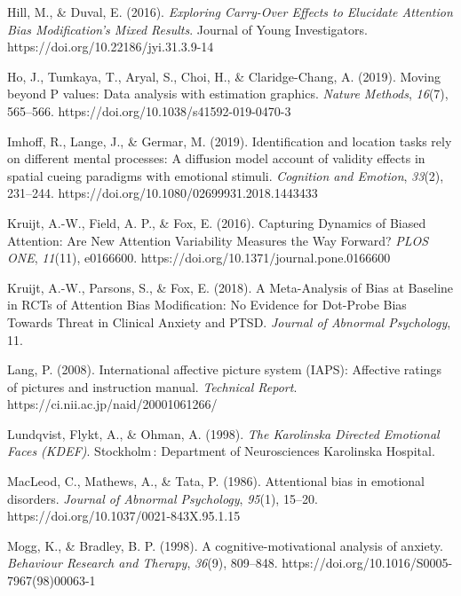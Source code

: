 \documentclass{article}
\begin{document}
	Hill, M., \& Duval, E. (2016). \emph{Exploring Carry-Over Effects to Elucidate Attention Bias Modification's Mixed Results}. Journal of Young Investigators. https://doi.org/10.22186/jyi.31.3.9-14



	Ho, J., Tumkaya, T., Aryal, S., Choi, H., \& Claridge-Chang, A. (2019). Moving beyond P values: Data analysis with estimation graphics. \emph{Nature Methods}, \emph{16}(7), 565--566. https://doi.org/10.1038/s41592-019-0470-3



	Imhoff, R., Lange, J., \& Germar, M. (2019). Identification and location tasks rely on different mental processes: A diffusion model account of validity effects in spatial cueing paradigms with emotional stimuli. \emph{Cognition and Emotion}, \emph{33}(2), 231--244. https://doi.org/10.1080/02699931.2018.1443433



	Kruijt, A.-W., Field, A. P., \& Fox, E. (2016). Capturing Dynamics of Biased Attention: Are New Attention Variability Measures the Way Forward? \emph{PLOS ONE}, \emph{11}(11), e0166600. https://doi.org/10.1371/journal.pone.0166600



	Kruijt, A.-W., Parsons, S., \& Fox, E. (2018). A Meta-Analysis of Bias at Baseline in RCTs of Attention Bias Modification: No Evidence for Dot-Probe Bias Towards Threat in Clinical Anxiety and PTSD. \emph{Journal of Abnormal Psychology}, 11.



	Lang, P. (2008). International affective picture system (IAPS): Affective ratings of pictures and instruction manual. \emph{Technical Report}. https://ci.nii.ac.jp/naid/20001061266/



	Lundqvist, Flykt, A., \& Ohman, A. (1998). \emph{The Karolinska Directed Emotional Faces (KDEF)}. Stockholm : Department of Neurosciences Karolinska Hospital.



	MacLeod, C., Mathews, A., \& Tata, P. (1986). Attentional bias in emotional disorders. \emph{Journal of Abnormal Psychology}, \emph{95}(1), 15--20. https://doi.org/10.1037/0021-843X.95.1.15



	Mogg, K., \& Bradley, B. P. (1998). A cognitive-motivational analysis of anxiety. \emph{Behaviour Research and Therapy}, \emph{36}(9), 809--848. https://doi.org/10.1016/S0005-7967(98)00063-1
\end{document}
